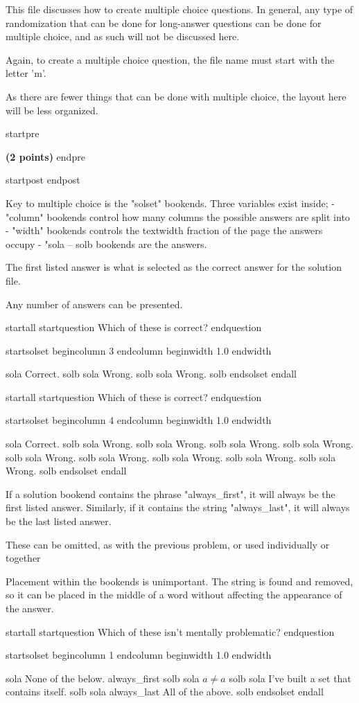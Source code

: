 This file discusses how to create multiple choice questions. In general, any type of randomization that can be done for long-answer questions can be done for multiple choice, and as such will not be discussed here.

Again, to create a multiple choice question, the file name must start with the letter 'm'.


As there are fewer things that can be done with multiple choice, the layout here will be less organized.



startpre \item {\bf (2 points)} endpre

startpost
endpost



Key to multiple choice is the "solset" bookends. Three variables exist inside;
-  "column" bookends control how many columns the possible answers are split into
-  "width" bookends controls the textwidth fraction of the page the answers occupy
-  "sola -- solb bookends are the answers.

The first listed answer is what is selected as the correct answer for the solution file.

Any number of answers can be presented.


startall
startquestion Which of these is correct?
endquestion

startsolset
begincolumn 3 endcolumn
beginwidth 1.0 endwidth

sola Correct. solb
sola Wrong. solb
sola Wrong. solb
endsolset
endall




startall
startquestion Which of these is correct?
endquestion

startsolset
begincolumn 4 endcolumn
beginwidth 1.0 endwidth

sola Correct. solb
sola Wrong. solb
sola Wrong. solb
sola Wrong. solb
sola Wrong. solb
sola Wrong. solb
sola Wrong. solb
sola Wrong. solb
sola Wrong. solb
sola Wrong. solb
endsolset
endall



If a solution bookend contains the phrase "always_first", it will always be the first listed answer. Similarly, if it contains the string "always_last", it will always be the last listed answer.

These can be omitted, as with the previous problem, or used individually or together

Placement within the bookends is unimportant. The string is found and removed, so it can be placed in the middle of a word without affecting the appearance of the answer.

startall
startquestion Which of these isn't mentally problematic?
endquestion

startsolset
begincolumn 1 endcolumn
beginwidth 1.0 endwidth

sola None of the below. always_first solb
sola $a \neq a$ solb
sola I've built a set that contains itself. solb
sola always_last All of the above. solb
endsolset
endall

